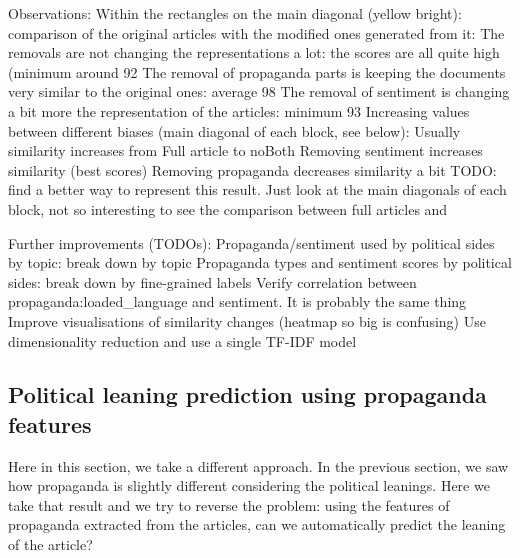 Observations:
Within the rectangles on the main diagonal (yellow bright): comparison of the original articles with the modified ones generated from it:
The removals are not changing the representations a lot: the scores are all quite high (minimum around 92%
The removal of propaganda parts is keeping the documents very similar to the original ones: average 98%
The removal of sentiment is changing a bit more the representation of the articles: minimum 93%
Increasing values between different biases (main diagonal of each block, see below):
Usually similarity increases from Full article to noBoth
Removing sentiment increases similarity (best scores)
Removing propaganda decreases similarity a bit
TODO: find a better way to represent this result. Just look at the main diagonals of each block, not so interesting to see the comparison between full articles and 

Further improvements (TODOs):
Propaganda/sentiment used by political sides by topic: break down by topic
Propaganda types and sentiment scores by political sides: break down by fine-grained labels
Verify correlation between propaganda:loaded\_language and sentiment. It is probably the same thing
Improve visualisations of similarity changes (heatmap so big is confusing)
Use dimensionality reduction and use a single TF-IDF model








\subsection{\statusorange Political leaning prediction using propaganda features}
\label{ssec:ps_prop_leaning_classifier}

Here in this section, we take a different approach.
In the previous section, we saw how propaganda is slightly different considering the political leanings.
Here we take that result and we try to reverse the problem: using the features of propaganda extracted from the articles, can we automatically predict the leaning of the article?

